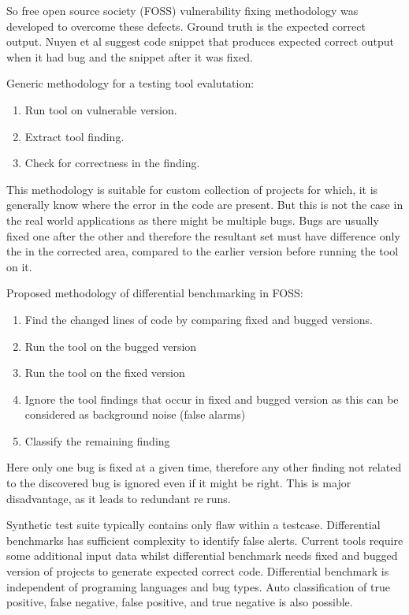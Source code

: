 \documentclass[authoryear,preprint]{sigplanconf}
\begin{document}
So free open source society (FOSS) \cite{Pashchenko:2017:FVD:3106237.3121276} vulnerability fixing methodology was developed to overcome these defects. Ground truth is the expected correct output. Nuyen et al \cite{Do:2016:TAB:2931021.2931023} suggest code snippet that produces expected correct output when it had bug and the snippet after it was fixed.

Generic methodology for a testing tool evalutation: 
\begin{enumerate}
	\item Run tool on vulnerable version.
	\item Extract tool finding.
	\item Check for correctness in the finding.
\end{enumerate}

This methodology is suitable for custom collection of projects for which, it is generally know where the error in the code are present. But this is not the case in the real world applications as there might be multiple bugs. Bugs are usually fixed one after the other and therefore the resultant set must have difference only the in the corrected area, compared to the earlier version before running the tool on it. 

Proposed methodology of differential benchmarking in FOSS:
\begin{enumerate}
	\item Find the changed lines of code by comparing fixed and bugged versions.
	\item Run the tool on the bugged version
	\item Run the tool on the fixed version
	\item Ignore the tool findings that occur in fixed and bugged version as this can be considered as background noise (false alarms)
	\item Classify the remaining finding
\end{enumerate}

Here only one bug is fixed at a given time, therefore any other finding not related to the discovered bug is ignored even if it might be right. This is major disadvantage, as it leads to redundant re runs.

Synthetic test suite typically contains only flaw within a testcase. Differential benchmarks has sufficient complexity to identify false alerts. Current tools require some additional input data whilst differential benchmark needs fixed and bugged version of projects to generate expected correct code. Differential benchmark is independent of programing languages and bug types. Auto classification of true positive, false negative, false positive, and true negative is also possible. 
\end{document}
